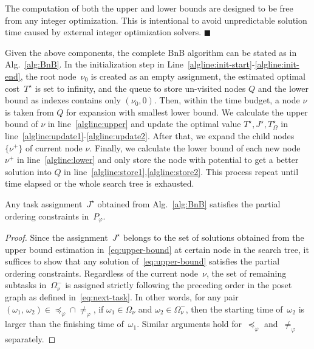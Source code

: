 
\begin{remark}\label{remark:none-milp}
The computation of both the upper and lower bounds are designed
to be free from any integer optimization.
This is intentional to avoid unpredictable solution time caused by
external integer optimization solvers.
\hfill $\blacksquare$
\end{remark}

Given the above components, the complete BnB algorithm can be stated as
in Alg.~\ref{alg:BnB}.
In the initialization step in
Line~\ref{algline:init-start}-\ref{algline:init-end},
the root node~$\nu_0$ is created as an empty assignment,
the estimated optimal cost~$T^{\star}$ is set to infinity,
and the queue to store un-visited nodes $Q$ and the lower bound as indexes contains only $(\nu_0,0)$.
Then, within the time budget, a node $\nu$ is taken from $Q$ for expansion with smallest lower bound.
We calculate the upper bound of $\nu$ in line~\ref{algline:upper} and update the optimal value $T^\star,J^\star,T^\star_\Omega$
in line~\ref{algline:update1}-\ref{algline:update2}.
After that, we expand the child nodes $\{\nu^+\}$ of current node $\nu$.
Finally, we calculate the lower bound of each new node $\nu^+$ in line~\ref{algline:lower} and only store
the node with potential to get a better solution into $Q$ in line~\ref{algline:store1},\ref{algline:store2}.
This process repeat until time elapsed or the whole search tree is
exhausted.

\begin{lemma}\label{lemma:BnB-satisfying}
Any task assignment~$J^\star$ obtained from Alg.~\ref{alg:BnB} satisfies
the partial ordering constraints in~$P_{\varphi}$.
\end{lemma}
\begin{proof}
Since the assignment~$J^\star$ belongs to the set of solutions obtained from
the upper bound estimation in~\eqref{eq:upper-bound}
at certain node in the search tree, it suffices to show that any solution
of~\eqref{eq:upper-bound} satisfies the partial ordering constraints.
Regardless of the current node~$\nu$, the set of remaining subtasks
in~$\Omega^-_\nu$ is assigned strictly following the preceding order
in the poset graph as defined in~\eqref{eq:next-task}.
In other words, for any pair~$(\omega_1,\,\omega_2)\in \preceq_{\varphi}\cap \neq_{\varphi}$,
if $\omega_1\in \Omega_\nu$ and $\omega_2\in \Omega^-_\nu$,
then the starting time of~$\omega_2$ is larger than the finishing time of~$\omega_1$.
Similar arguments hold for~$\preceq_{\varphi}$ and~$\neq_{\varphi}$ separately.
\end{proof}
